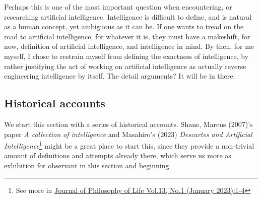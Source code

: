 Perhaps this is one of the most important question when encountering, or researching artificial intelligence. Intelligence is difficult to define, and is natural as a human concept, yet ambiguous as it can be. If one wants to tread on the road to artificial intelligence, for whatever it is, they must have a makeshift, for now, definition of artificial intelligence, and intelligence in mind. By then, for me myself, I chose to restrain myself from defining the exactness of intelligence, by rather justifying the act of working on artificial intelligence as actually reverse engineering intelligence by itself. The detail arguments? It will be in there. 

\subsection{Historical accounts}

We start this section with a series of historical accounts. Shane, Marcus (2007)'s paper \textit{A collection of intelligence} and Masahiro's (2023) \textit{Descartes and Artificial Intelligence}\footnote{See more in \href{https://www.philosophyoflife.org/jpl2023si_book.pdf}{Journal of Philosophy of Life Vol.13, No.1 (January 2023):1-4}} might be a great place to start this, since they provide a non-trivial amount of definitions and attempts already there, which serve us more as exhibition for observant in this section and beginning. 

